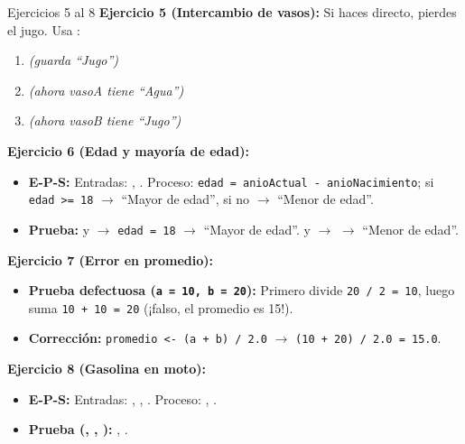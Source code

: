 \documentclass[11pt,letterpaper]{article}
\begin{document}
\begin{solucion}{Ejercicios 5 al 8}
\textbf{Ejercicio 5 (Intercambio de vasos):} Si haces  directo, pierdes el jugo. Usa :
\begin{enumerate}
  \item {} \textit{(guarda ``Jugo'')}
  \item {} \textit{(ahora vasoA tiene ``Agua'')}
  \item {} \textit{(ahora vasoB tiene ``Jugo'')}
\end{enumerate}

\textbf{Ejercicio 6 (Edad y mayoría de edad):}
\begin{itemize}
  \item \textbf{E-P-S:} Entradas: , . Proceso: \texttt{edad = anioActual - anioNacimiento}; si \texttt{edad >= 18} $\rightarrow$ ``Mayor de edad'', si no $\rightarrow$ ``Menor de edad''.
  \item \textbf{Prueba:}  y  $\rightarrow$ \texttt{edad = 18} $\rightarrow$ ``Mayor de edad''.  y  $\rightarrow$  $\rightarrow$ ``Menor de edad''.
\end{itemize}

\textbf{Ejercicio 7 (Error en promedio):}
\begin{itemize}
  \item \textbf{Prueba defectuosa (\texttt{a = 10, b = 20}):} Primero divide \texttt{20 / 2 = 10}, luego suma \texttt{10 + 10 = 20} (¡falso, el promedio es 15!).
  \item \textbf{Corrección:} \texttt{promedio <- (a + b) / 2.0} $\rightarrow$ \texttt{(10 + 20) / 2.0 = 15.0}.
\end{itemize}

\textbf{Ejercicio 8 (Gasolina en moto):}
\begin{itemize}
  \item \textbf{E-P-S:} Entradas: , , . Proceso: , .
  \item \textbf{Prueba (, , ):} , .
\end{itemize}
\end{solucion}
\end{document}
